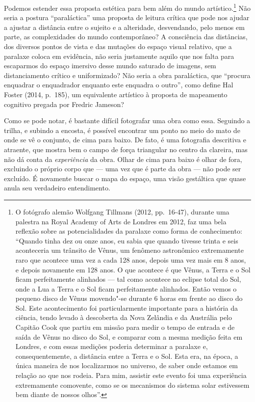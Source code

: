 Podemos estender essa proposta estética para bem além do mundo
artístico.\footnote{O fotógrafo alemão Wolfgang Tillmans (2012, pp.~16-47), durante uma
  palestra na Royal Academy of Arts de Londres em 2012, faz uma bela
  reflexão sobre as potencialidades da paralaxe como forma de
  conhecimento: ``Quando tinha dez ou onze anos, eu sabia que quando
  tivesse trinta e seis aconteceria um trânsito de Vênus, um fenômeno
  astronômico extremamente raro que acontece uma vez a cada 128 anos,
  depois uma vez mais em 8 anos, e depois novamente em 128 anos. O que
  acontece é que Vênus, a Terra e o Sol ficam perfeitamente alinhados ---
  tal como acontece no eclipse total do Sol, onde a Lua a Terra e o Sol
  ficam perfeitamente alinhados. Então vemos o pequeno disco de Vênus
  movendo"-se durante 6 horas em frente ao disco do Sol. Este
  acontecimento foi particularmente importante para a história da
  ciência, tendo levado à descoberta da Nova Zelândia e da Austrália
  pelo Capitão Cook que partiu em missão para medir o tempo de entrada e
  de saída de Vênus no disco do Sol, e comparar com a mesma medição
  feita em Londres, e com essas medições poderia determinar a paralaxe
  e, consequentemente, a distância entre a Terra e o Sol. Esta era, na
  época, a única maneira de nos localizarmos no universo, de saber onde
  estamos em relação ao que nos rodeia. Para mim, assistir este evento
  foi uma experiência extremamente comovente, como se os mecanismos do
  sistema solar estivessem bem diante de nossos olhos''.} Não
seria a postura ``paraláctica'' uma proposta de leitura crítica que pode
nos ajudar a ajustar a distância entre o sujeito e a alteridade,
desvendando, pelo menos em parte, as complexidades do mundo
contemporâneo? A consciência das distâncias, dos diversos pontos de
vista e das mutações do espaço visual relativo, que a paralaxe coloca em
evidência, não seria justamente aquilo que nos falta para escaparmos do
espaço imersivo desse mundo saturado de imagens, sem distanciamento
crítico e uniformizado? Não seria a obra paraláctica, que ``procura
enquadrar o enquadrador enquanto este enquadra o outro'', como define
Hal Foster (2014, p.~185), um equivalente artístico à proposta de
mapeamento cognitivo pregada por Fredric Jameson?

Como se pode notar, é bastante difícil fotografar uma obra como essa.
Seguindo a trilha, e subindo a encosta, é possível encontrar um ponto no
meio do mato de onde se vê o conjunto, de cima para baixo. De fato, é
uma fotografia descritiva e atraente, que mostra bem o campo de força
triangular no centro da clareira, mas não dá conta da \emph{experiência}
da obra. Olhar de cima para baixo é olhar de fora, excluindo o próprio
corpo que --- uma vez que é parte da obra --- não pode ser excluído. É
novamente buscar o mapa do espaço, uma visão gestáltica que quase anula
seu verdadeiro entendimento.

